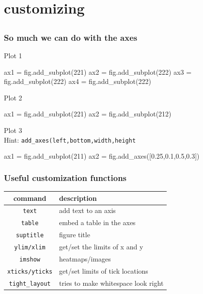 \documentclass[xcolor=dvipsnames]{beamer}
\newcommand{\highlt}{\textcolor{myorange}}
\begin{document}
\section{customizing}
\subsection{}

\begin{frame}[fragile]
\frametitle{So much we can do with the axes}
\scriptsize
Plot 1
\begin{code}
ax1 = fig.add_subplot(221)
ax2 = fig.add_subplot(222)
ax3 = fig.add_subplot(222)
ax4 = fig.add_subplot(222)
\end{code}
Plot 2
\begin{code}
ax1 = fig.add_subplot(221)
ax2 = fig.add_subplot(212)
\end{code}
Plot 3 \ \\
\highlt{Hint:} \texttt{add\_axes(left,bottom,width,height}
\begin{code}
ax1 = fig.add_subplot(211)
ax2 = fig.add_axes([0.25,0.1,0.5,0.3])
\end{code}
\end{frame}

\begin{frame}[fragile]
\frametitle{Useful customization functions}
\footnotesize
\begin{center}
    \begin{table}
        \begin{tabular}{|c|l|}
	\hline
	command                      & description                     \\
	\hline
	\texttt{text}            & add text to an axis        \\
	\texttt{table}           & embed a table in the axes  \\
	\texttt{suptitle}        & figure title               \\
	\texttt{ylim/xlim}       & get/set the limits of x and y  \\ 
	\texttt{imshow}          & heatmaps/images            \\
	\texttt{xticks/yticks}   & get/set limits of tick locations  \\
	\texttt{tight\_layout}   & tries to make whitespace look right \\
	\hline
	\end{tabular}
    \end{table}
\end{center}
\end{frame}
\end{document}
